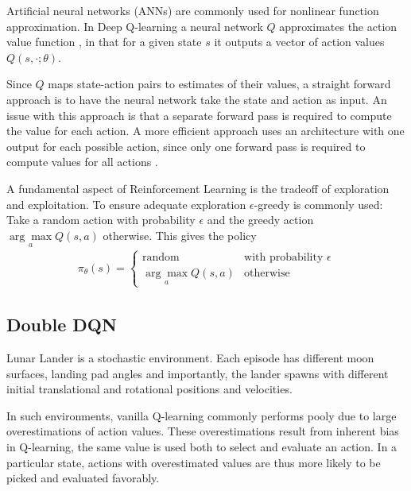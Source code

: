 \documentclass{article}
\begin{document}
Artificial neural networks (ANNs) are commonly used for nonlinear function approximation. In Deep Q-learning a neural network $Q$ approximates the action value function \cite{Sutton1998}, in that for a given state $s$ it outputs a vector of action values $Q(s,\cdot; \theta)$.

Since $Q$ maps state-action pairs to estimates of their values, a straight forward approach is to have the neural network take the state and action as input. An issue with this approach is that a separate forward pass is required to compute the value for each action. A more efficient approach uses an architecture with one output for each possible action, since only one forward pass is required to compute values for all actions \cite{mnih2015humanlevel}.

A fundamental aspect of Reinforcement Learning is the tradeoff of exploration and exploitation. To ensure adequate exploration $\epsilon$-greedy is commonly used: Take a random action with probability $\epsilon$
and the greedy action $\underset{a}{\arg \max} Q(s,a)$ otherwise. This gives the policy
\begin{align*}
  \pi_\theta (s) =
  \begin{cases}
    \text{random}                   & \text{with probability } \epsilon \\
    \underset{a}{\arg \max} Q(s, a) & \text{otherwise}
  \end{cases}
\end{align*}

\subsection{Double DQN}
Lunar Lander is a stochastic environment. Each episode has different moon surfaces, landing pad angles and importantly, the lander spawns with different initial translational and rotational positions and velocities.

In such environments, vanilla Q-learning commonly performs pooly due to large overestimations of action values. These overestimations result from inherent bias in Q-learning, the same value is used both to select and evaluate an action. In a particular state, actions with overestimated values are thus more likely to be picked and evaluated favorably.
\end{document}
